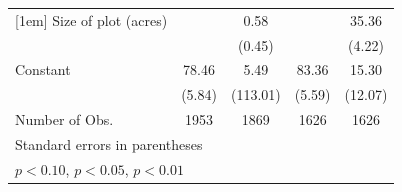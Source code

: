 {\begin{tabular}{l*{4}{c}}
[1em]
Size of plot (acres)&                     &        0.58         &                     &       35.36\sym{***}\\
                    &                     &      (0.45)         &                     &      (4.22)         \\
[1em]
Constant            &       78.46\sym{***}&        5.49         &       83.36\sym{***}&       15.30         \\
                    &      (5.84)         &    (113.01)         &      (5.59)         &     (12.07)         \\
\hline
Number of  Obs.     &        1953         &        1869         &        1626         &        1626         \\
\hline\hline
\multicolumn{5}{l}{\footnotesize Standard errors in parentheses}\\
\multicolumn{5}{l}{\footnotesize \sym{*} \(p<0.10\), \sym{**} \(p<0.05\), \sym{***} \(p<0.01\)}\\
\end{tabular}
}
